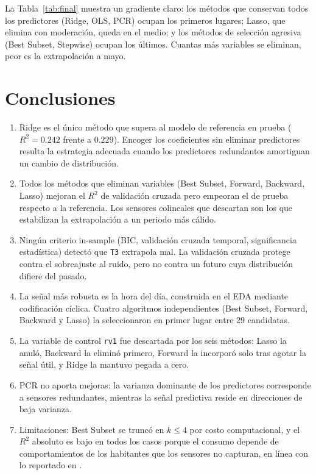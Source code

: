 \documentclass[11pt,a4paper]{article}
\begin{document}
La Tabla~\ref{tab:final} muestra un gradiente claro: los métodos que conservan todos los
predictores (Ridge, OLS, PCR) ocupan los primeros lugares; Lasso, que elimina con moderación,
queda en el medio; y los métodos de selección agresiva (Best Subset, Stepwise) ocupan los
últimos. Cuantas más variables se eliminan, peor es la extrapolación a mayo.

\section{Conclusiones}

\begin{enumerate}
  \item Ridge es el único método que supera al modelo de referencia en prueba ($R^2 = 0.242$
        frente a $0.229$). Encoger los coeficientes sin eliminar predictores resulta la
        estrategia adecuada cuando los predictores redundantes amortiguan un cambio de
        distribución.
  \item Todos los métodos que eliminan variables (Best Subset, Forward, Backward, Lasso) mejoran
        el $R^2$ de validación cruzada pero empeoran el de prueba respecto a la referencia. Los
        sensores colineales que descartan son los que estabilizan la extrapolación a un periodo
        más cálido.
  \item Ningún criterio in-sample (BIC, validación cruzada temporal, significancia estadística)
        detectó que \texttt{T3} extrapola mal. La validación cruzada protege contra el
        sobreajuste al ruido, pero no contra un futuro cuya distribución difiere del pasado.
  \item La señal más robusta es la hora del día, construida en el EDA mediante codificación
        cíclica. Cuatro algoritmos independientes (Best Subset, Forward, Backward y Lasso) la
        seleccionaron en primer lugar entre 29 candidatas.
  \item La variable de control \texttt{rv1} fue descartada por los seis métodos: Lasso la anuló,
        Backward la eliminó primero, Forward la incorporó solo tras agotar la señal útil, y
        Ridge la mantuvo pegada a cero.
  \item PCR no aporta mejoras: la varianza dominante de los predictores corresponde a sensores
        redundantes, mientras la señal predictiva reside en direcciones de baja varianza.
  \item Limitaciones: Best Subset se truncó en $k \le 4$ por costo computacional, y el $R^2$
        absoluto es bajo en todos los casos porque el consumo depende de comportamientos de los
        habitantes que los sensores no capturan, en línea con lo reportado en
        \cite{candanedo2017}.
\end{enumerate}
\end{document}
